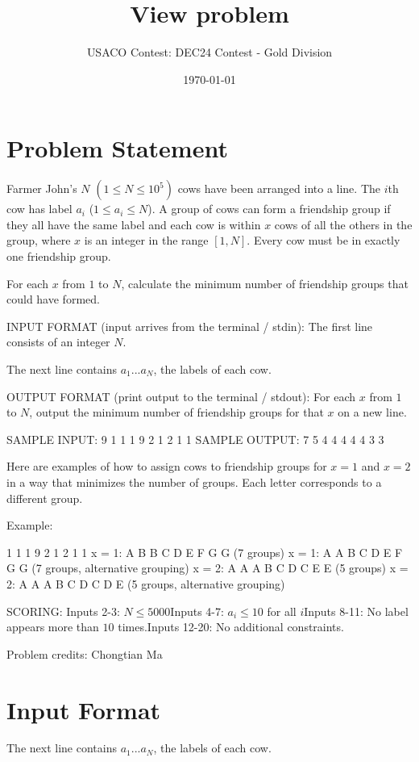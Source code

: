\documentclass[12pt]{article}
\title{View problem}
\author{USACO Contest: DEC24 Contest - Gold Division}
\date{\today}
\begin{document}
\maketitle

\section*{Problem Statement}


Farmer John's $N$ $(1 \leq N \leq 10^5)$ cows have been arranged into a line. 
The $i$th cow has label $a_i$ ($1 \leq a_i \leq N$). A group of cows  can form a
friendship group if they all have the same label and each cow is  within $x$
cows of all the others in the group, where $x$ is an integer in the range
$[1,N]$.  Every cow must be in exactly one friendship group.

For each $x$ from $1$ to $N$, calculate the minimum number of friendship groups
that could have formed.

INPUT FORMAT (input arrives from the terminal / stdin):
The first line consists of an integer $N$.

The next line contains $a_1 ... a_N$, the labels of each cow.

OUTPUT FORMAT (print output to the terminal / stdout):
For each $x$ from $1$ to $N$, output the minimum number of friendship groups for
that $x$ on a new line.

SAMPLE INPUT:
9
1 1 1 9 2 1 2 1 1
SAMPLE OUTPUT: 
7
5
4
4
4
4
4
3
3


Here are examples of how to assign cows to friendship groups for $x=1$ and $x=2$
in a way that minimizes the number of groups. Each letter corresponds to a
different group.


Example:

       1 1 1 9 2 1 2 1 1
x = 1: A B B C D E F G G (7 groups)
x = 1: A A B C D E F G G (7 groups, alternative grouping)
x = 2: A A A B C D C E E (5 groups)
x = 2: A A A B C D C D E (5 groups, alternative grouping)

SCORING:
Inputs 2-3: $N\le 5000$Inputs 4-7: $a_i\le 10$ for all $i$Inputs 8-11: No label appears more than $10$ times.Inputs 12-20: No additional constraints.


Problem credits: Chongtian Ma



\section*{Input Format}
The next line contains $a_1 ... a_N$, the labels of each cow.
\end{document}
